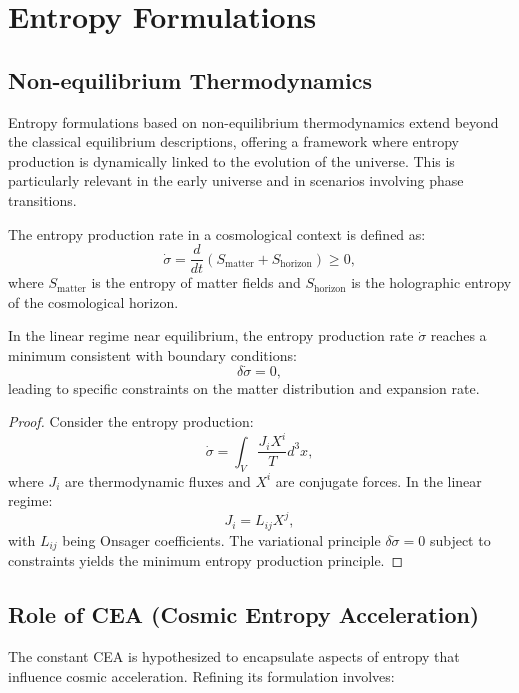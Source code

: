 \section{Entropy Formulations}

\subsection{Non-equilibrium Thermodynamics}

Entropy formulations based on non-equilibrium thermodynamics extend beyond the classical equilibrium descriptions, offering a framework where entropy production is dynamically linked to the evolution of the universe. This is particularly relevant in the early universe and in scenarios involving phase transitions.

\begin{definition}
The entropy production rate in a cosmological context is defined as:
\[
\dot{\sigma} = \frac{d}{dt}\left(S_{\text{matter}} + S_{\text{horizon}}\right) \geq 0,
\]
where $S_{\text{matter}}$ is the entropy of matter fields and $S_{\text{horizon}}$ is the holographic entropy of the cosmological horizon.
\end{definition}

\begin{theorem}
In the linear regime near equilibrium, the entropy production rate $\dot{\sigma}$ reaches a minimum consistent with boundary conditions:
\[
\delta \dot{\sigma} = 0,
\]
leading to specific constraints on the matter distribution and expansion rate.
\end{theorem}

\begin{proof}
Consider the entropy production:
\[
\dot{\sigma} = \int_V \frac{J_i X^i}{T} d^3x,
\]
where $J_i$ are thermodynamic fluxes and $X^i$ are conjugate forces. In the linear regime:
\[
J_i = L_{ij} X^j,
\]
with $L_{ij}$ being Onsager coefficients. The variational principle $\delta \dot{\sigma} = 0$ subject to constraints yields the minimum entropy production principle.
\end{proof}

\subsection{Role of CEA (Cosmic Entropy Acceleration)}

The constant CEA is hypothesized to encapsulate aspects of entropy that influence cosmic acceleration. Refining its formulation involves:

